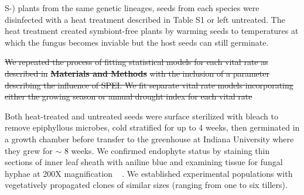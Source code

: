 \documentclass[lineno,sn-nature]{sn-jnl}%
\providecommand{\DIFadd}[1]{{\protect\color{blue}#1}} %
\providecommand{\DIFdel}[1]{{\protect\color{red}\protect\scriptsize\sout{#1}}}
\providecommand{\DIFadd}[1]{{\protect\color{blue}\uwave{#1}}} %
\providecommand{\DIFdel}[1]{{\protect\color{red}\sout{#1}}}                      %
\providecommand{\DIFaddbegin}{} %
\providecommand{\DIFaddend}{} %
\providecommand{\DIFdelbegin}{} %
\providecommand{\DIFdelend}{} %
\newcommand{\DIFscaledelfig}{0.5}
\newlength{\DIFdelgraphicswidth} %
\newlength{\DIFdelgraphicsheight} %
\newcommand{\DIFaddincludegraphics}[2][]{{\color{blue}\fbox{\DIFOincludegraphics[#1]{#2}}}} %
\newcommand{\DIFdelincludegraphics}[2][]{%
\sbox{\DIFdelgraphicsbox}{\DIFOincludegraphics[#1]{#2}}%
\settoboxwidth{\DIFdelgraphicswidth}{\DIFdelgraphicsbox} %
\settoboxtotalheight{\DIFdelgraphicsheight}{\DIFdelgraphicsbox} %
\scalebox{\DIFscaledelfig}{%
\parbox[b]{\DIFdelgraphicswidth}{\usebox{\DIFdelgraphicsbox}\\[-\baselineskip] \rule{\DIFdelgraphicswidth}{0em}}\llap{\resizebox{\DIFdelgraphicswidth}{\DIFdelgraphicsheight}{%
\setlength{\unitlength}{\DIFdelgraphicswidth}%
\begin{picture}(1,1)%
\thicklines\linethickness{2pt} %
{\color[rgb]{1,0,0}\put(0,0){\framebox(1,1){}}}%
{\color[rgb]{1,0,0}\put(0,0){\line( 1,1){1}}}%
{\color[rgb]{1,0,0}\put(0,1){\line(1,-1){1}}}%
\end{picture}%
}\hspace*{3pt}}} %
} %
\DeclareRobustCommand{\DIFaddbegin}{\DIFOaddbegin \let\includegraphics\DIFaddincludegraphics} %
\DeclareRobustCommand{\DIFaddend}{\DIFOaddend \let\includegraphics\DIFOincludegraphics} %
\DeclareRobustCommand{\DIFdelbegin}{\DIFOdelbegin \let\includegraphics\DIFdelincludegraphics} %
\DeclareRobustCommand{\DIFdelend}{\DIFOaddend \let\includegraphics\DIFOincludegraphics} %
\begin{document}
\begin{appendices}
{{}\hspace{0pt}%
}\DIFdelend \DIFaddbegin \DIFadd{S-) plants from the same genetic lineages, seeds from each species were disinfected with a heat treatment described in Table S1 or left untreated. 
The heat treatment created symbiont-free plants by warming seeds to temperatures at which the fungus becomes inviable but the host seeds can still germinate.

}\DIFaddend 


\DIFdelbegin \DIFdel{We repeated the process of fitting statistical models for each vital rate as described in }\textbf{\DIFdel{Materials and Methods}} %
\DIFdel{with the inclusion of a parameter describing the influence of SPEI. 
	We fit separate vital rate models incorporating either the growing season or annual drought index for each vital rate}\DIFdelend \DIFaddbegin \DIFadd{Both heat-treated and untreated seeds were surface sterilized with bleach to remove epiphyllous microbes, cold stratified for up to 4 weeks, then germinated in a growth chamber before transfer to the greenhouse at Indiana University where they grew for $\sim$ 8 weeks. 
We confirmed endophyte status by staining thin sections of inner leaf sheath with aniline blue and examining tissue for fungal hyphae at 200X magnification \mbox{%
\cite{bacon2018stains}}\hspace{0pt}%
. 
We established experimental populations with vegetatively propagated clones of similar sizes (ranging from one to six tillers). 

}


\end{appendices}
\end{document}

